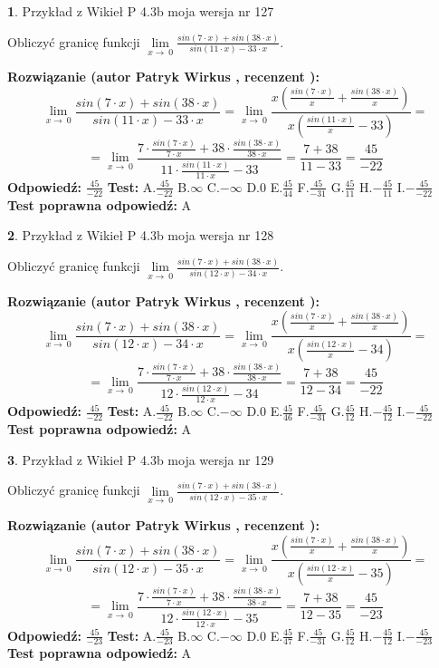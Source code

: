 \documentclass[12pt, a4paper]{article}
\theoremstyle{definition} %
\newtheorem{zad}{}
\newcommand{\zadStart}[1]{\begin{zad}#1\newline}
\newcommand{\zadStop}{\end{zad}}
\newcommand{\rozwStart}[2]{\noindent \textbf{Rozwiązanie (autor #1 , recenzent #2): }\newline}
\newcommand{\rozwStop}{\newline}
\newcommand{\odpStart}{\noindent \textbf{Odpowiedź:}\newline}
\newcommand{\odpStop}{\newline}
\newcommand{\testStart}{\noindent \textbf{Test:}\newline}
\newcommand{\testStop}{\newline}
\newcommand{\kluczStart}{\noindent \textbf{Test poprawna odpowiedź:}\newline}
\newcommand{\kluczStop}{\newline}
\begin{document}
\zadStart{Przykład z Wikieł P 4.3b moja wersja nr 127}


Obliczyć granicę funkcji $\lim\limits_{x\to\ 0}\frac{sin(7 \cdot x)+sin(38 \cdot x)}{sin(11 \cdot x)-33 \cdot x}$.
\zadStop
\rozwStart{Patryk Wirkus}{}
$$\lim\limits_{x\to\ 0}\frac{sin(7 \cdot x)+sin(38 \cdot x)}{sin(11 \cdot x)-33 \cdot x}=\lim\limits_{x\to\ 0}\frac{x(\frac{sin(7 \cdot x)}{x}+\frac{sin(38 \cdot x)}{x})}{x(\frac{sin(11 \cdot x)}{x}-33)}=$$
$$=\lim\limits_{x\to\ 0}\frac{7 \cdot \frac{sin(7 \cdot x)}{7 \cdot x}+38 \cdot \frac{sin(38 \cdot x)}{38 \cdot x}}{11 \cdot \frac{sin(11 \cdot x)}{11 \cdot x}-33}=\frac{7+38}{11-33} = \frac{45}{-22}$$
\rozwStop
\odpStart
$\frac{45}{-22}$
\odpStop
\testStart
A.$\frac{45}{-22}$
B.$\infty$
C.$-\infty$
D.$0$
E.$\frac{45}{44}$
F.$\frac{45}{-31}$
G.$\frac{45}{11}$
H.$-\frac{45}{11}$
I.$-\frac{45}{-22}$
\testStop
\kluczStart
A
\kluczStop



\zadStart{Przykład z Wikieł P 4.3b moja wersja nr 128}


Obliczyć granicę funkcji $\lim\limits_{x\to\ 0}\frac{sin(7 \cdot x)+sin(38 \cdot x)}{sin(12 \cdot x)-34 \cdot x}$.
\zadStop
\rozwStart{Patryk Wirkus}{}
$$\lim\limits_{x\to\ 0}\frac{sin(7 \cdot x)+sin(38 \cdot x)}{sin(12 \cdot x)-34 \cdot x}=\lim\limits_{x\to\ 0}\frac{x(\frac{sin(7 \cdot x)}{x}+\frac{sin(38 \cdot x)}{x})}{x(\frac{sin(12 \cdot x)}{x}-34)}=$$
$$=\lim\limits_{x\to\ 0}\frac{7 \cdot \frac{sin(7 \cdot x)}{7 \cdot x}+38 \cdot \frac{sin(38 \cdot x)}{38 \cdot x}}{12 \cdot \frac{sin(12 \cdot x)}{12 \cdot x}-34}=\frac{7+38}{12-34} = \frac{45}{-22}$$
\rozwStop
\odpStart
$\frac{45}{-22}$
\odpStop
\testStart
A.$\frac{45}{-22}$
B.$\infty$
C.$-\infty$
D.$0$
E.$\frac{45}{46}$
F.$\frac{45}{-31}$
G.$\frac{45}{12}$
H.$-\frac{45}{12}$
I.$-\frac{45}{-22}$
\testStop
\kluczStart
A
\kluczStop



\zadStart{Przykład z Wikieł P 4.3b moja wersja nr 129}


Obliczyć granicę funkcji $\lim\limits_{x\to\ 0}\frac{sin(7 \cdot x)+sin(38 \cdot x)}{sin(12 \cdot x)-35 \cdot x}$.
\zadStop
\rozwStart{Patryk Wirkus}{}
$$\lim\limits_{x\to\ 0}\frac{sin(7 \cdot x)+sin(38 \cdot x)}{sin(12 \cdot x)-35 \cdot x}=\lim\limits_{x\to\ 0}\frac{x(\frac{sin(7 \cdot x)}{x}+\frac{sin(38 \cdot x)}{x})}{x(\frac{sin(12 \cdot x)}{x}-35)}=$$
$$=\lim\limits_{x\to\ 0}\frac{7 \cdot \frac{sin(7 \cdot x)}{7 \cdot x}+38 \cdot \frac{sin(38 \cdot x)}{38 \cdot x}}{12 \cdot \frac{sin(12 \cdot x)}{12 \cdot x}-35}=\frac{7+38}{12-35} = \frac{45}{-23}$$
\rozwStop
\odpStart
$\frac{45}{-23}$
\odpStop
\testStart
A.$\frac{45}{-23}$
B.$\infty$
C.$-\infty$
D.$0$
E.$\frac{45}{47}$
F.$\frac{45}{-31}$
G.$\frac{45}{12}$
H.$-\frac{45}{12}$
I.$-\frac{45}{-23}$
\testStop
\kluczStart
A
\kluczStop
\end{document}

